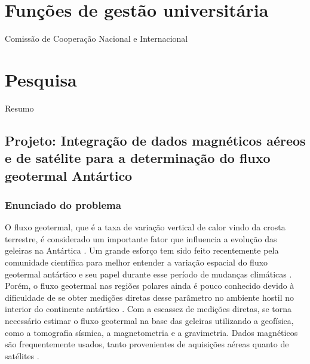 \documentclass[11pt,a4paper,oneside]{book}
\begin{document}
\chapter{Funções de gestão universitária}

Comissão de Cooperação Nacional e Internacional

\chapter{Pesquisa}

Resumo


\section{%
  Projeto: Integração de dados magnéticos aéreos e de satélite para a
  determinação do fluxo geotermal Antártico
}

\subsection{Enunciado do problema}

O fluxo geotermal, que é a taxa de variação vertical de calor vindo da
crosta terrestre, é considerado um importante fator que influencia a evolução
das geleiras na Antártica \citep{Seroussi2017}.
Um grande esforço tem sido feito recentemente pela comunidade científica para
melhor entender a variação espacial do fluxo geotermal antártico e seu papel
durante esse período de mudanças climáticas \citep{BurtonJohnson2020}.
Porém, o fluxo geotermal nas regiões polares ainda é pouco conhecido devido à
dificuldade de se obter medições diretas desse parâmetro no ambiente hostil no
interior do continente antártico \citep{BurtonJohnson2020}.
Com a escassez de medições diretas, se torna necessário estimar o fluxo
geotermal na base das geleiras utilizando a geofísica, como a tomografia
sísmica, a magnetometria e a gravimetria.
Dados magnéticos são frequentemente usados, tanto provenientes de aquisições
aéreas \citep[e.g.,][]{Lowe2023} quanto de satélites
\citep[e.g.,][]{FoxMaule2005}.
\end{document}

